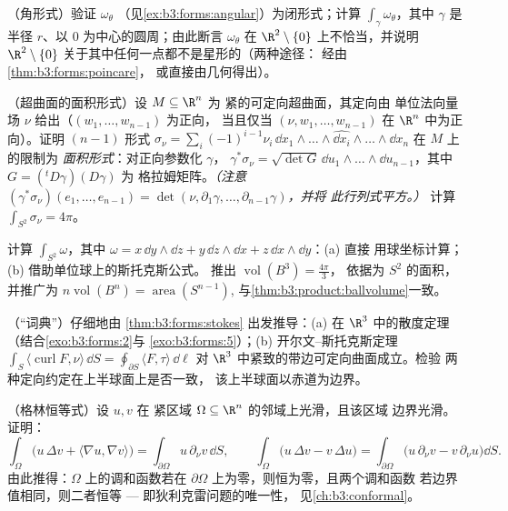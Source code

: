 \begin{exercise}[$\star\star$]\label{exo:b3:forms:4}
（角形式）验证 $\omega_\theta$
（见\cref{ex:b3:forms:angular}）为闭形式；计算
$\int_\gamma\omega_\theta$，其中 $\gamma$ 是半径
$r$、以 $0$ 为中心的圆周；由此断言 $\omega_\theta$ 在
$\R^2\setminus\{0\}$ 上不恰当，并说明 $\R^2\setminus\{0\}$
关于其中任何一点都不是星形的（两种途径：
经由\cref{thm:b3:forms:poincare}，
或直接由几何得出）。
\end{exercise}

\begin{exercise}[$\star\star$]\label{exo:b3:forms:5}
（超曲面的面积形式）设 $M \subseteq \R^n$ 为
紧的可定向超曲面，其定向由
单位法向量场 $\nu$ 给出（$(w_1, \dots, w_{n-1})$ 为正向，
当且仅当 $(\nu, w_1, \dots, w_{n-1})$ 在 $\R^n$ 中为正向）。证明
$(n-1)$ 形式 $\sigma_\nu =
\sum_i(-1)^{i-1}\nu_i\,\dd x_1\wedge\dots\wedge\widehat{\dd
x_i}\wedge\dots\wedge\dd x_n$ 在 $M$ 上的限制为
\emph{面积形式}：对正向参数化 $\gamma$，
$\gamma^*\sigma_\nu = \sqrt{\det G}\,\dd u_1\wedge\dots
\wedge\dd u_{n-1}$，其中 $G = ({}^t D\gamma)(D\gamma)$ 为
格拉姆矩阵。\emph{（注意
$(\gamma^*\sigma_\nu)(e_1, \dots, e_{n-1}) = \det(\nu,
\partial_1\gamma, \dots, \partial_{n-1}\gamma)$，并将
此行列式平方。）} 计算 $\int_{S^2}\sigma_\nu = 4\pi$。
\end{exercise}

\begin{exercise}[$\star\star$]\label{exo:b3:forms:6}
计算 $\int_{S^2}\omega$，其中 $\omega = x\,\dd y\wedge\dd z
+ y\,\dd z\wedge\dd x + z\,\dd x\wedge\dd y$：(a) 直接
用球坐标计算；(b) 借助单位球上的斯托克斯公式。
推出 $\operatorname{vol}(B^3) = \frac{4\pi}3$，
依据为 $S^2$ 的面积，并推广为
$n\operatorname{vol}(B^n) = \operatorname{area}(S^{n-1})$,
与\cref{thm:b3:product:ballvolume}一致。
\end{exercise}

\begin{exercise}[$\star\star$]\label{exo:b3:forms:7}
（“词典”）仔细地由
\cref{thm:b3:forms:stokes} 出发推导：(a) 在
$\R^3$ 中的散度定理（结合\cref{exo:b3:forms:2}与
\cref{exo:b3:forms:5}）；(b) 开尔文--斯托克斯定理
$\int_S\langle\operatorname{curl}F, \nu\rangle\,\dd S =
\oint_{\partial S}\langle F, \tau\rangle\,\dd\ell$ 对
$\R^3$ 中紧致的带边可定向曲面成立。检验
两种定向约定在上半球面上是否一致，
该上半球面以赤道为边界。
\end{exercise}

\begin{exercise}[$\star\star$]\label{exo:b3:forms:8}
（格林恒等式）设 $u, v$ 在
紧区域 $\Omega \subseteq \R^n$ 的邻域上光滑，且该区域
边界光滑。证明：
\[
\int_\Omega\bigl(u\,\Delta v + \langle\nabla u, \nabla
v\rangle\bigr) = \int_{\partial\Omega}u\,\partial_\nu
v\,\dd S,
\qquad
\int_\Omega\bigl(u\,\Delta v - v\,\Delta u\bigr) =
\int_{\partial\Omega}\bigl(u\,\partial_\nu v -
v\,\partial_\nu u\bigr)\dd S .
\]
由此推得：$\Omega$ 上的调和函数若在
$\partial\Omega$ 上为零，则恒为零，且两个调和函数
若边界值相同，则二者恒等 ---
即狄利克雷问题的唯一性，
见\cref{ch:b3:conformal}。
\end{exercise}

